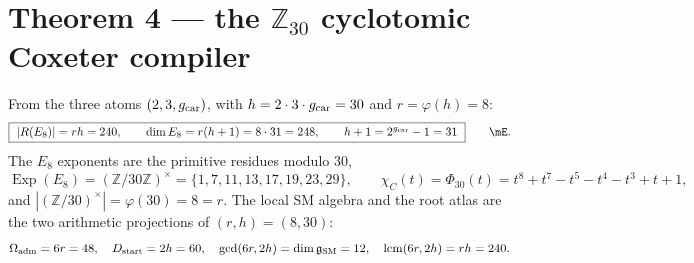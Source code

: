 \section*{Theorem 4 --- the $\mathbb Z_{30}$ cyclotomic Coxeter compiler}
From the three atoms $(2,3,g_{\mathrm{car}})$, with $h=2\cdot3\cdot g_{\mathrm{car}}=30$ and $r=\varphi(h)=8$:
\begin{equation}
  \boxed{\ |R(E_8)|=rh=240,\qquad \dim E_8=r(h+1)=8\cdot31=248,\qquad h+1=2^{\gcar}-1=31\ }\qquad\mE .
\end{equation}
The $E_8$ exponents are the primitive residues modulo $30$,
\begin{equation}
  \operatorname{Exp}(E_8)=(\mathbb Z/30\mathbb Z)^\times=\{1,7,11,13,17,19,23,29\},\qquad
  \chi_C(t)=\Phi_{30}(t)=t^8+t^7-t^5-t^4-t^3+t+1 ,
\end{equation}
and $|(\mathbb Z/30)^\times|=\varphi(30)=8=r$. The local SM algebra and the root atlas are the two
arithmetic projections of $(r,h)=(8,30)$:
\begin{equation}
  \Omega_{\mathrm{adm}}=6r=48,\quad D_{\mathrm{start}}=2h=60,\quad \gcd(6r,2h)=\dim\mathfrak g_{\mathrm{SM}}=12,\quad \operatorname{lcm}(6r,2h)=rh=240 .
\end{equation}

